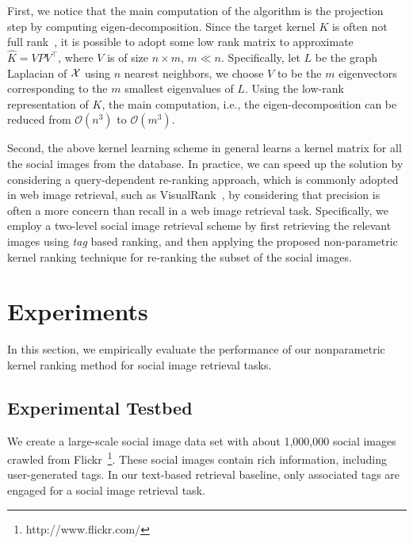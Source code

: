 First, we notice that the main computation of the algorithm is the projection step by computing eigen-decomposition. Since the target kernel $K$ is often not full
rank~\cite{icml/ZhuangTH09}, it is possible to adopt some low rank matrix to approximate $\widehat K = VPV^\top$, where $V$ is of size $n\times m$, $m \ll n$.
Specifically, let $L$ be the graph Laplacian of ${\mathcal X}$ using $n$ nearest neighbors, we choose $V$ to be the $m$ eigenvectors corresponding to the $m$ smallest
eigenvalues of $L$. Using the low-rank representation of $K$, the main computation, i.e., the eigen-decomposition can be reduced from $\mathcal{O}(n^3)$ to
$\mathcal{O}(m^3)$.

Second, the above kernel learning scheme in general learns a kernel matrix for all the social images from the database. In practice, we can speed up the solution by
considering a query-dependent re-ranking approach, which is commonly adopted in
web image retrieval, such as VisualRank~\cite{pami/JingB08}, by considering that
precision is often a more concern than recall in a web image retrieval task.
Specifically, we employ a two-level social image retrieval scheme by first retrieving
the relevant images using {\em tag} based ranking, and then applying the proposed
non-parametric kernel ranking technique for re-ranking the subset of the social images.

\section{Experiments} \label{sec:rerank-experiment}

In this section, we empirically evaluate the performance of our nonparametric kernel ranking method for social image retrieval tasks.

\subsection{Experimental Testbed}

We create a large-scale social image data set with about 1,000,000 social images
crawled from Flickr~\footnote{http://www.flickr.com/}. These social images contain
rich information, including user-generated tags. In our text-based retrieval baseline,
only associated tags are engaged for a social image retrieval task.


